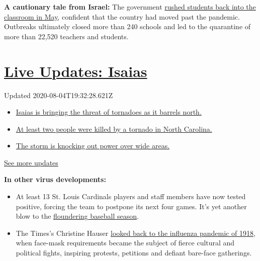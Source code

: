 \textbf{A cautionary tale from Israel:} The government
\href{https://www.nytimes.com/2020/08/04/world/middleeast/coronavirus-israel-schools-reopen.html}{rushed
students back into the classroom in May}, confident that the country had
moved past the pandemic. Outbreaks ultimately closed more than 240
schools and led to the quarantine of more than 22,520 teachers and
students.

\hypertarget{live-updates-isaias}{%
\section{\texorpdfstring{\href{https://www.nytimes.com/2020/08/04/us/isaias-storm-updates.html?action=click\&pgtype=Article\&state=default\&region=MAIN_CONTENT_1\&context=storylines_live_updates}{Live
Updates: Isaias}}{Live Updates: Isaias}}\label{live-updates-isaias}}

Updated 2020-08-04T19:32:28.621Z

\begin{itemize}
\tightlist
\item
  \href{https://www.nytimes.com/2020/08/04/us/isaias-storm-updates.html?action=click\&pgtype=Article\&state=default\&region=MAIN_CONTENT_1\&context=storylines_live_updates\#link-362830dd}{Isaias
  is bringing the threat of tornadoes as it barrels north.}
\item
  \href{https://www.nytimes.com/2020/08/04/us/isaias-storm-updates.html?action=click\&pgtype=Article\&state=default\&region=MAIN_CONTENT_1\&context=storylines_live_updates\#link-7961bdbc}{At
  least two people were killed by a tornado in North Carolina.}
\item
  \href{https://www.nytimes.com/2020/08/04/us/isaias-storm-updates.html?action=click\&pgtype=Article\&state=default\&region=MAIN_CONTENT_1\&context=storylines_live_updates\#link-34e5d4e4}{The
  storm is knocking out power over wide areas.}
\end{itemize}

\href{https://www.nytimes.com/2020/08/04/us/isaias-storm-updates.html?action=click\&pgtype=Article\&state=default\&region=MAIN_CONTENT_1\&context=storylines_live_updates}{See
more updates}

\textbf{In other virus developments:}

\begin{itemize}
\item
  At least 13 St. Louis Cardinals players and staff members have now
  tested positive, forcing the team to postpone its next four games.
  It's yet another blow to the
  \href{https://www.nytimes.com/2020/08/03/sports/baseball/mlb-coronavirus-outbreak.html?action=click\&module=RelatedLinks\&pgtype=Article}{floundering
  baseball season}.
\item
  The Times's Christine Hauser
  \href{https://www.nytimes.com/2020/08/03/us/mask-protests-1918.html}{looked
  back to the influenza pandemic of 1918}, when face-mask requirements
  became the subject of fierce cultural and political fights, inspiring
  protests, petitions and defiant bare-face gatherings.
\end{itemize}

